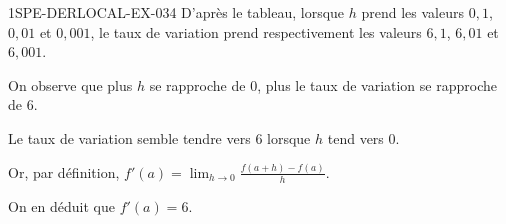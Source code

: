 \begin{corrige}{1SPE-DERLOCAL-EX-034}
D'après le tableau, lorsque $h$ prend les valeurs $0{,}1$, $0{,}01$ et $0{,}001$, le taux de variation prend respectivement les valeurs $6{,}1$, $6{,}01$ et $6{,}001$.

On observe que plus $h$ se rapproche de $0$, plus le taux de variation se rapproche de $6$.

Le taux de variation semble tendre vers $6$ lorsque $h$ tend vers $0$.

Or, par définition, $f'(a) = \displaystyle\lim_{h \to 0} \frac{f(a+h)-f(a)}{h}$.

On en déduit que $\boxed{f'(a) = 6}$.
\end{corrige}
